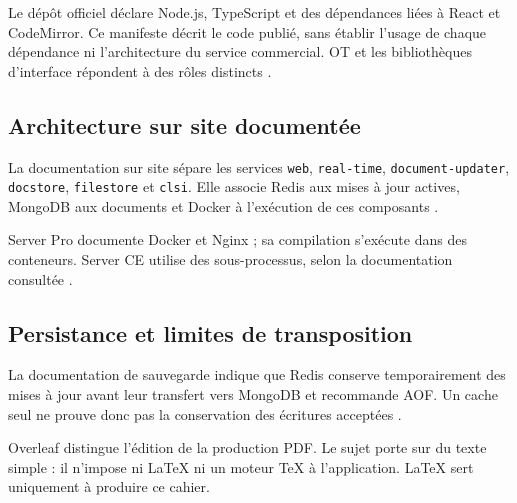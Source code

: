Le dépôt officiel déclare Node.js, TypeScript et des dépendances liées à React et CodeMirror. Ce manifeste décrit le code publié, sans établir l'usage de chaque dépendance ni l'architecture du service commercial. OT et les bibliothèques d'interface répondent à des rôles distincts \cite{overleaf-code}.

\subsection{Architecture sur site documentée}
La documentation sur site sépare les services \texttt{web}, \texttt{real-time}, \texttt{document-updater}, \texttt{docstore}, \texttt{filestore} et \texttt{clsi}. Elle associe Redis aux mises à jour actives, MongoDB aux documents et Docker à l'exécution de ces composants \cite{overleaf-microservices}.

Server Pro documente Docker et Nginx ; sa compilation s'exécute dans des conteneurs. Server CE utilise des sous-processus, selon la documentation consultée \cite{overleaf-infra,overleaf-microservices}.




\subsection{Persistance et limites de transposition}
La documentation de sauvegarde indique que Redis conserve temporairement des mises à jour avant leur transfert vers MongoDB et recommande AOF. Un cache seul ne prouve donc pas la conservation des écritures acceptées \cite{overleaf-backups}.

Overleaf distingue l'édition de la production PDF. Le sujet porte sur du texte simple : il n'impose ni LaTeX ni un moteur TeX à l'application. LaTeX sert uniquement à produire ce cahier.


